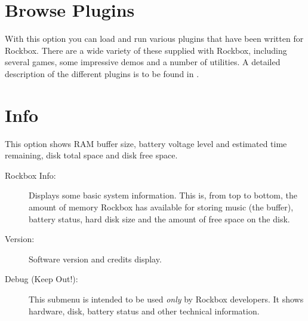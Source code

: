 \section{Browse Plugins}
  With this option you can load and run various plugins that have been
written for Rockbox. There are a wide variety of these supplied with
Rockbox, including several games, some impressive demos and a number of
utilities. A detailed description of the different plugins is to be found in 
.

\section{\label{ref:Info}Info}
  This option shows RAM buffer size, battery voltage level and estimated time
remaining, disk total space and disk free space.

\begin{description}
\item[Rockbox Info:]
  Displays some basic system information.  This is, from top to bottom, 
the amount of memory Rockbox has available for storing music (the buffer),
battery status, hard disk size and the amount of free space on the disk.
  
\item[Version:]
  Software version and credits display.
  
\item[Debug (Keep Out!):]
  This submenu is intended to be used \emph{only} by Rockbox developers.
  It shows hardware, disk, battery status and other technical information.  
\end{description}



